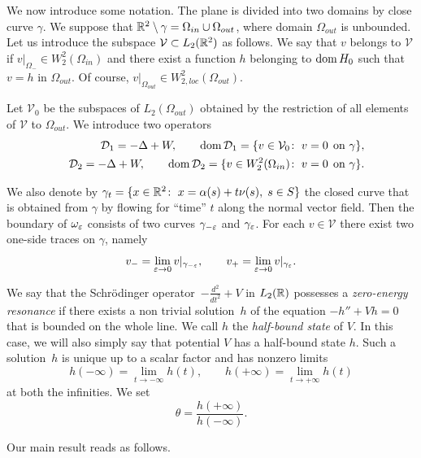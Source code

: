 We now introduce some notation. The plane is divided into two domains by close curve $\gamma$.  We suppose that $\mathbb R^2\setminus\gamma=\Omega_{in}\cup\Omega_{out}$, where domain $\Omega_{out}$ is unbounded. Let us introduce the subspace $\mathcal{V}\subset L_2(\mathbb R^2)$ as follows.
We say that $v$ belongs to $\mathcal{V}$ if $v|_{\Omega_-}\in W_2^2(\Omega_{in})$ and there exist a function $h$ belonging to $\mathop{\rm dom} H_0$ such that $v=h$ in $\Omega_{out}$. Of course, $v|_{\Omega_{out}}\in W_{2, loc}^2(\Omega_{out})$.

Let $\mathcal{V}_0$ be the subspaces of $L_2(\Omega_{out})$
obtained by the restriction of all elements of $\mathcal{V}$ to $\Omega_{out}$.   We introduce two operators
\begin{eqnarray}\nonumber
&&\mathcal{D}_1= -\Delta+W, \qquad \mathop{\rm dom} \mathcal{D}_1=\{v\in \mathcal{V}_0\colon\; v=0 \;\,\mbox{on } \gamma\},\\\nonumber
&&\mathcal{D}_2= -\Delta+W, \qquad \mathop{\rm dom} \mathcal{D}_2=\{v\in W_2^2(\Omega_{in})\colon\; v=0 \;\,\mbox{on } \gamma\}.
\end{eqnarray}


We also denote by $\gamma_t=\{x\in\mathbb R^2\colon\; x=\alpha(s)+t\nu(s), \; s\in S\}$ the closed curve that is obtained from $\gamma$ by flowing for ``time'' $t$ along the normal vector field. Then the boundary of $\omega_\varepsilon$ consists of two curves $\gamma_{-\varepsilon}$ and $\gamma_{\varepsilon}$. For each $v\in \mathcal{V}$ there exist two one-side traces on $\gamma$, namely
$$
  v_-=\lim_{\varepsilon\to 0}v|_{\gamma_{-\varepsilon}}, \qquad
v_+=\lim_{\varepsilon\to 0}v|_{\gamma_{\varepsilon}}.
$$






We say that the Schr\"odinger operator~$-\frac{d^2}{d t^2}+V$ in $L_2(\mathbb R)$ possesses a \emph{zero-energy resonance}  if there exists a non trivial solution~$h$ of the equation $-h'' +Vh= 0$ that is bounded on the whole line.  We call $h$ the \emph{half-bound state} of $V$. In this case, we will also simply say that potential $V$ has a half-bound state $h$. Such a solution~$h$ is  unique up to a scalar factor and has nonzero limits
$$
  h(-\infty)=\lim\limits_{t\to-\infty}h(t), \qquad
  h(+\infty)=\lim\limits_{t\to+\infty}h(t)
$$
at both the infinities. We set
\begin{equation}\label{Theta}
  \theta=\frac{h(+\infty)}{h(-\infty)}.
\end{equation}



Our main result reads as follows.



